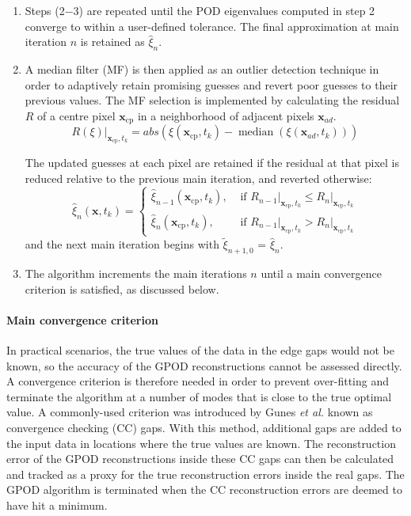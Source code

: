 \documentclass{article}
\begin{document}
\begin{enumerate}
\item Steps (2$-$3) are repeated until the POD eigenvalues computed in step 2 converge to within a user-defined tolerance. The final approximation at main iteration $n$ is retained as $\hat{\xi}_{n}$.

\item A median filter (MF) is then applied as an outlier detection technique in order to adaptively retain promising guesses and revert poor guesses to their previous values. The MF selection is implemented by calculating the residual $R$ of a centre pixel $\mathbf{x}_{\mathrm{cp}}$ in a neighborhood of adjacent pixels $\mathbf{x}_{ad}$.
$$
\left.R(\xi)\right|_{\mathbf{x}_{\mathrm{cp}}, t_k}=abs\left(\xi\left(\mathbf{x}_{\mathrm{cp}}, t_k\right)-\operatorname{median}\left(\xi\left(\mathbf{x}_{ad}, t_k\right)\right)\right)
$$

The updated guesses at each pixel are retained if the residual at that pixel is reduced relative to the previous main iteration, and reverted otherwise:
$$
\hat{\xi}_n\left(\mathbf{x}, t_k\right)= \begin{cases}\hat{\xi}_{n-1}\left(\mathbf{x}_{\mathrm{cp}}, t_k\right), & \text { if }\left.R_{n-1}\right|_{\mathbf{x}_{\mathrm{cp}}, t_k} \leq\left. R_n\right|_{\mathbf{x}_{\mathrm{cp}}, t_k} \\ \hat{\xi}_n\left(\mathbf{x}_{\mathrm{cp}}, t_k\right), & \text { if }\left.R_{n-1}\right|_{\mathbf{x}_{\mathrm{cp}}, t_k}>\left.R_n\right|_{\mathbf{x}_{\mathrm{cp}}, t_k}\end{cases}
$$
and the next main iteration begins with $\tilde{\xi}_{n+1,0}$ = $\hat{\xi}_n$.

\item The algorithm increments the main iterations $n$ until a main convergence criterion is satisfied, as discussed below.

\end{enumerate}

\paragraph{Main convergence criterion}
In practical scenarios, the true values of the data in the edge gaps would not be known, so the accuracy of the GPOD reconstructions cannot be assessed directly. A convergence criterion is therefore needed in order to prevent over-fitting and terminate the algorithm at a number of modes that is close to the true optimal value.
A commonly-used criterion was introduced by Gunes \textit{et al.} \cite{gunes2006gappy} known as convergence checking (CC) gaps. With this method, additional gaps are added to the input data in locations where the true values are known. The reconstruction error of the GPOD reconstructions inside these CC gaps can then be calculated and tracked as a proxy for the true reconstruction errors inside the real gaps. The GPOD algorithm is terminated when the CC reconstruction errors are deemed to have hit a minimum.
\end{document}
